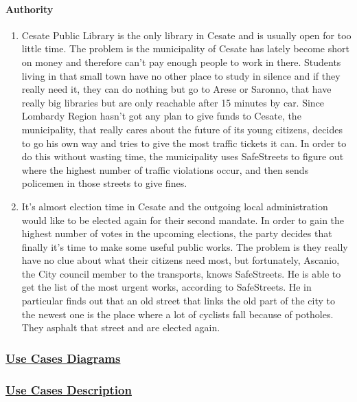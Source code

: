 		\paragraph{Authority}
		\begin{enumerate}
			\item \label{sce:basicAuthority} Cesate Public Library is the only library in Cesate and is usually open for too little time. The problem is the municipality of Cesate has lately become short on money and therefore can’t pay enough people to work in there. Students living in that small town have no other place to study in silence and if they really need it, they can do nothing but go to Arese or Saronno, that have really big libraries but are only reachable after 15 minutes by car. Since Lombardy Region hasn’t got any plan to give funds to Cesate, the municipality, that really cares about the future of its young citizens, decides to go his own way and tries to give the most traffic tickets it can. In order to do this without wasting time, the municipality uses SafeStreets to figure out where the highest number of traffic violations occur, and then sends policemen in those streets to give fines.
			
			\item \label{sce:advancedAuthority} It’s almost election time in Cesate and the outgoing local administration would like to be elected again for their second mandate. In order to gain the highest number of votes in the upcoming elections, the party decides that finally it’s time to make some useful public works. The problem is they really have no clue about what their citizens need most, but fortunately, Ascanio, the City council member to the transports, knows SafeStreets. He is able to get the list of the most urgent works, according to SafeStreets. He in particular finds out that an old street that links the old part of the city to the newest one is the place where a lot of cyclists fall because of potholes. They asphalt that street and are elected again.
		\end{enumerate}
		
	\subsubsection[Use Cases Diagrams]{\hyperlink{toc}{Use Cases Diagrams}}
	
	\subsubsection[Use Cases Description]{\hyperlink{toc}{Use Cases Description}}
		\label{sec:useCases}
		
